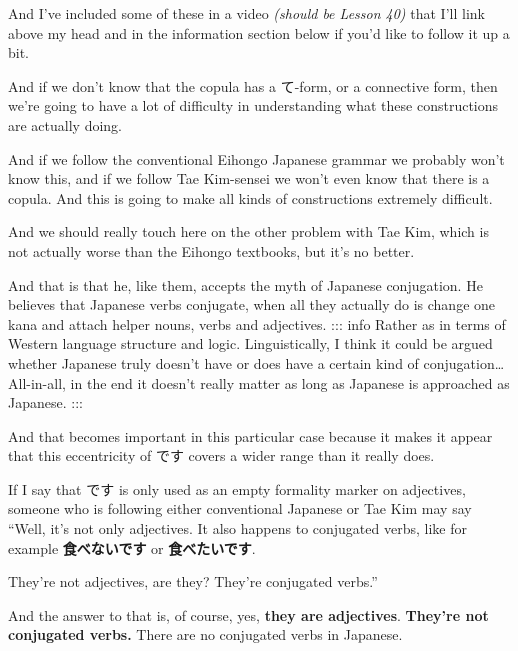{}

And I've included some of these in a video {\em (should be Lesson 40)} that I'll link above my head and in the information section below if you'd like to follow it up a bit.

And if we don't know that the copula has a て-form, or a connective form, then we're going to have a lot of difficulty in understanding what these constructions are actually doing.

And if we follow the conventional Eihongo Japanese grammar we probably won't know this, and if we follow Tae Kim-sensei we won't even know that there is a copula. And this is going to make all kinds of constructions extremely difficult.

\stopsectionlevel

\startsectionlevel[title={The matter with conjugation},reference={the-matter-with-conjugation}]

And we should really touch here on the other problem with Tae Kim, which is not actually worse than the Eihongo textbooks, but it's no better.

{}

And that is that he, like them, accepts the myth of Japanese conjugation. He believes that Japanese verbs conjugate, when all they actually do is change one kana and attach helper nouns, verbs and adjectives. ::: info Rather as in terms of Western language structure and logic. Linguistically, I think it could be argued whether Japanese truly doesn't have or does have a certain kind of conjugation\ldots{}\crlf
All-in-all, in the end it doesn't really matter as long as Japanese is approached as Japanese. :::

And that becomes important in this particular case because it makes it appear that this eccentricity of です covers a wider range than it really does.

If I say that です is only used as an empty formality marker on adjectives, someone who is following either conventional Japanese or Tae Kim may say “Well, it's not only adjectives. It also happens to conjugated verbs, like for example {\bf 食べないです} or {\bf 食べたいです}.

They're not adjectives, are they? They're conjugated verbs.”

And the answer to that is, of course, yes, {\bf they are adjectives}. {\bf They're not conjugated verbs.} There are no conjugated verbs in Japanese.


